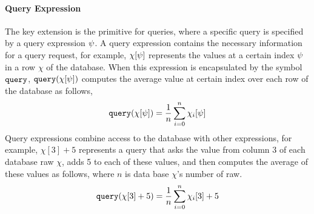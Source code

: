 \paragraph{Query Expression}
The key extension is
the primitive for queries, where a specific query is specified by a query expression $\psi$. 
A query expression contains the necessary information for a query request, 
for example, $\chi[\psi]$ represents the values at a certain index $\psi$ in a row $\chi$ of the database. 
When this expression is encapsulated by the symbol ${\tt query}$,
 $ {\tt query}(\chi[\psi]) $ computes the average value at certain index over each row of the database as follows,
 \[
  {\tt query}(\chi[\psi]) = \frac{1}{n}\sum\limits_{i = 0}^{n}\chi_i[\psi]
  \]
Query expressions combine access to the database with other expressions, 
for example, 
$\chi[3] + 5$ represents a query that asks the value from column 3 of each database raw $\chi$, 
adds 5 to each of these values, and then computes the average of these values as follows, where $n$ is 
data base $\chi$'s number of raw.
%
\[
  {\tt query}(\chi[3] + 5) = \frac{1}{n}\sum\limits_{i = 0}^{n}\chi_i[3] + 5
  \]

% 

